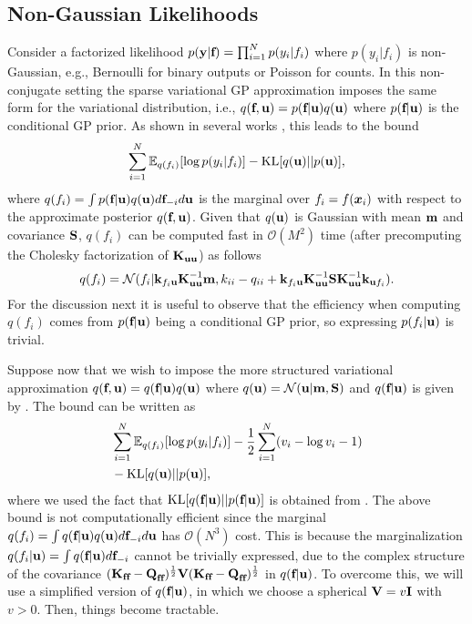 \subsection{Non-Gaussian Likelihoods
\label{sec:nongaussian}}

Consider a factorized  likelihood $p(\textbf{y} | \textbf{f}) = \prod_{i=1}^N p(y_ i | f_i)$ 
where  $p(y_ i | f_i)$ is non-Gaussian, e.g., Bernoulli  for binary outputs  
or Poisson for counts.  
In this non-conjugate setting the sparse 
variational GP approximation imposes the same form for the variational distribution, i.e., $q(\textbf{f}, \textbf{u}) = p(\textbf{f} | \textbf{u}) q(\textbf{u})$ 
where $p(\textbf{f} | \textbf{u})$ is the 
conditional GP prior. As shown in several works \cite{Chai12,hensman2015scalable,lloyd15,Dezfouli15,Sheth15}, this leads to the bound 
 \begin{equation}
 \sum_{i=1}^N 
\mathbb{E}_{q(f_i)} [\log p(y_i | f_i)]   - \text{KL}[q(\textbf{u}) || p(\textbf{u})],
\label{eq:standard_nonconjugate_bound}
 \end{equation} 
 where $q(f_i) = \int p(\textbf{f}  | \textbf{u}) q(\textbf{u} ) d \textbf{f}_{-i} d \textbf{u}$ is the marginal  over
 $f_i = f(\boldsymbol{x}_i)$  with respect to the approximate posterior $q(\textbf{f}, \textbf{u})$. Given 
 that  $q(\textbf{u})$ is  Gaussian with mean $\textbf{m}$ and covariance 
 $\textbf{S}$,  $q(f_i)$ can be computed fast in $\mathcal{O}(M^2)$ time (after precomputing the Cholesky factorization of
 $\textbf{K}_{\textbf{u} \textbf{u}}$) as follows 
 \begin{equation}
 q(f_i)  = \mathcal{N}(f_i | \textbf{k}_{f_i \textbf{u}} \textbf{K}_{\textbf{u} \textbf{u}}^{-1} \textbf{m}, k_{ii} - q_{ii} + \textbf{k}_{f_i \textbf{u}} \textbf{K}_{\textbf{u} \textbf{u}}^{-1} \textbf{S} \textbf{K}_{\textbf{u} \textbf{u}}^{-1} \textbf{k}_{\textbf{u} f_i}). 
 \end{equation}
For the discussion next it is useful to observe that the efficiency when computing $q(f_i)$ comes from $p(\textbf{f} | \textbf{u})$ being a conditional GP prior, so 
expressing $p(f_i | \textbf{u})$ is trivial. 

Suppose now that we wish to impose the more structured variational 
approximation $q(\textbf{f}, \textbf{u}) = q(\textbf{f} | \textbf{u})  q(\textbf{u})$ where
$q(\textbf{u}) = \mathcal{N}(\textbf{u} | \textbf{m}, \textbf{S})$ and $q(\textbf{f} | \textbf{u})$ 
is given by 
. The bound %
can be written as
\begin{align}
& \sum_{i=1}^N 
\mathbb{E}_{q(f_i)} [\log p(y_i | f_i)] - 
 \frac{1}{2} \sum_{i=1}^N (v_i - \log v_i - 1)
\nonumber \\
& - \text{KL}[q(\textbf{u}) || p(\textbf{u})],
\label{eq:nonGaussian_bound_intractable}
\end{align}
where we used the fact that 
$\text{KL}[q(\textbf{f}|\textbf{u}) || p(\textbf{f}|\textbf{u})]$ is obtained from  . The above bound
is not computationally efficient since 
the marginal $q(f_i) = \int q(\textbf{f}  | \textbf{u}) q(\textbf{u} ) d \textbf{f}_{-i} d \textbf{u}$ 
has $\mathcal{O}(N^3)$ cost. This  is because
the marginalization $q(f_i | \textbf{u}) = \int q(\textbf{f}  | \textbf{u}) d \textbf{f}_{-i}$ cannot be trivially expressed, due to the complex structure of the covariance
$(\textbf{K}_{\textbf{f} \textbf{f}} - \textbf{Q}_{\textbf{f} \textbf{f}})^{\frac{1}{2}} \textbf{V}
(\textbf{K}_{\textbf{f} \textbf{f}} - \textbf{Q}_{\textbf{f} \textbf{f}})^{\frac{1}{2}}$ in $q(\textbf{f} | \textbf{u})$. To overcome this,  we will use a simplified version of $q(\textbf{f} | \textbf{u})$, in which we choose a spherical $\textbf{V} = v \textbf{I}$ with $v > 0$. Then, things become tractable. 

